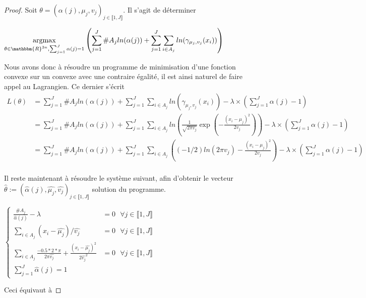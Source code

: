 \documentclass[frenchb]{report}
\newcommand{\R}{\mathbbm{R}}
\newcommand{\1}{\mathbbm{1}}
\theoremstyle{definition}\newtheorem{defn}{Définition}
\theoremstyle{definition}\newtheorem{exm}{Exemple}
\theoremstyle{definition}\newtheorem{nota}{Notation}
\theoremstyle{definition}\newtheorem{rem}{Remarque}
\begin{document}
\begin{proof}
Soit $\theta = (\alpha(j), \mu_j, v_j)_{j \in \llbracket 1,J \rrbracket}$. Il s'agit de déterminer 
\begin{center}
	$\underset{\theta\in\R^{3n}, \sum_{j=1}^J\alpha(j) = 1}{\text{argmax}}\left(\displaystyle\sum_{j=1}^J \#A_j ln(\alpha(j))+ \sum_{j=1}^J\sum_{i\in A_j} ln(\gamma_{\mu_j, v_j}(x_i))\right)$
\end{center}
Nous avons donc à résoudre un programme de minimisation d'une fonction convexe sur un convexe avec une contraire égalité, il est ainsi naturel de faire appel au Lagrangien. \newline 
Ce dernier s'écrit
\begin{align*} 
L(\theta) &= \displaystyle\sum_{j=1}^J \#A_j ln(\alpha(j))+ \sum_{j=1}^J\sum_{i\in A_j} ln(\gamma_{\mu_j, v_j}(x_i)) - \lambda\times\left(\sum_{j=1}^J\alpha(j) - 1\right)\\
&= \displaystyle\sum_{j=1}^J \#A_j ln(\alpha(j))+ \sum_{j=1}^J\sum_{i\in A_j} ln\left(\frac{1}{\sqrt{2\pi v_j}}\exp\left(-\frac{\left(x_i -\mu_j\right)^2}{2v_j} \right)\right) - \lambda\times\left(\sum_{j=1}^J\alpha(j) - 1\right)\\
&= \displaystyle\sum_{j=1}^J \#A_j ln(\alpha(j))+ \sum_{j=1}^J\sum_{i\in A_j}\left( (-1/2)ln(2\pi v_j) -\frac{(x_i-\mu_j)^2}{2v_j}\right) - \lambda\times\left(\sum_{j=1}^J\alpha(j) - 1\right)\\
\end{align*}

Il reste maintenant à résoudre le système suivant, afin d'obtenir le vecteur $\hat{\theta} := (\hat{\alpha}(j), \hat{\mu_j}, \hat{v_j})_{j\in\llbracket 1,J \rrbracket}$ solution du programme.

$
\begin{cases}
\displaystyle\frac{\#A_j}{\hat{\alpha}(j)} - \lambda &= 0 \text{ } \forall j \in \llbracket 1,J \rrbracket \\
\displaystyle\sum_{i\in A_j} (x_i-\hat{\mu_j})/\hat{v_j} & = 0 \text{ } \forall j \in \llbracket 1,J \rrbracket \\
\displaystyle\sum_{i\in A_j} \frac{-0.5 * 2 * \pi}{2\pi \hat{v_j}} +\frac{(x_i-\hat{\mu_j})^2}{2\hat{v_j}^2} &= 0 \text{ } \forall j \in \llbracket 1,J \rrbracket\\
\displaystyle\sum_{j=1}^J \hat{\alpha}(j) = 1
\end{cases}
$

Ceci équivaut à 


\end{proof}
\end{document}
